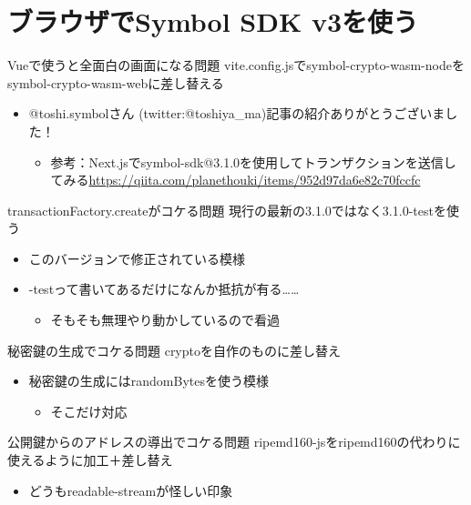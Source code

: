 \section{ブラウザでSymbol SDK v3を使う}

\begin{frame}{Vueで使うと全面白の画面になる問題}
	vite.config.jsでsymbol-crypto-wasm-nodeをsymbol-crypto-wasm-webに差し替える
	\begin{itemize}
		\item {} @toshi.symbolさん (twitter:@toshiya\_ma)記事の紹介ありがとうございました！
		\begin{itemize}
			\item 参考：Next.jsでsymbol-sdk@3.1.0を使用してトランザクションを送信してみる\url{https://qiita.com/planethouki/items/952d97da6e82c70fccfc}
		\end{itemize}
	\end{itemize}
\end{frame}

\begin{frame}{transactionFactory.createがコケる問題}
	現行の最新の3.1.0ではなく3.1.0-testを使う
	\begin{itemize}
		\item このバージョンで修正されている模様
		\item -testって書いてあるだけになんか抵抗が有る……
		\begin{itemize}
			\item そもそも無理やり動かしているので看過
		\end{itemize}
	\end{itemize}
\end{frame}

\begin{frame}{秘密鍵の生成でコケる問題}
	cryptoを自作のものに差し替え
	\begin{itemize}
		\item 秘密鍵の生成にはrandomBytesを使う模様
		\begin{itemize}
			\item そこだけ対応
		\end{itemize}
	\end{itemize}
\end{frame}

\begin{frame}{公開鍵からのアドレスの導出でコケる問題}
	ripemd160-jsをripemd160の代わりに使えるように加工＋差し替え
	\begin{itemize}
		\item どうもreadable-streamが怪しい印象
	\end{itemize}
\end{frame}
